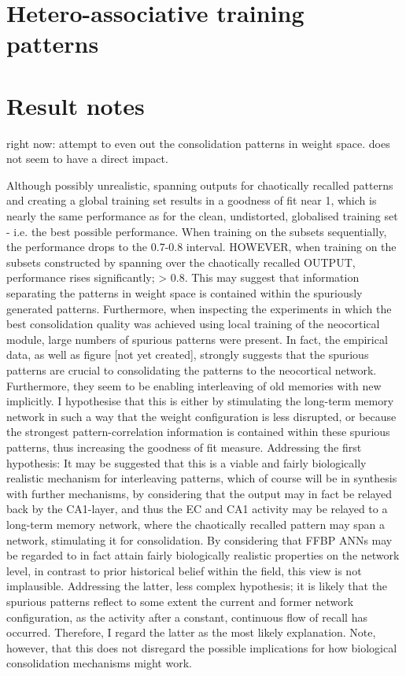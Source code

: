 \section{Hetero-associative training patterns}






\section*{Result notes}

right now: attempt to even out the consolidation patterns in weight space. does not seem to have a direct impact.

Although possibly unrealistic, spanning outputs for chaotically recalled patterns and creating a global training set results in a goodness of fit near 1, which is nearly the same performance as for the clean, undistorted, globalised training set - i.e. the best possible performance.
When training on the subsets sequentially, the performance drops to the 0.7-0.8 interval. HOWEVER, when training on the subsets constructed by spanning over the chaotically recalled OUTPUT, performance rises significantly; > 0.8.
This may suggest that information separating the patterns in weight space is contained within the spuriously generated patterns. Furthermore, when inspecting the experiments in which the best consolidation quality was achieved using local training of the neocortical module, large numbers of spurious patterns were present. In fact, the empirical data, as well as figure [not yet created], strongly suggests that the spurious patterns are crucial to consolidating the patterns to the neocortical network. Furthermore, they seem to be enabling interleaving of old memories with new implicitly. I hypothesise that this is either by stimulating the long-term memory network in such a way that the weight configuration is less disrupted, or because the strongest pattern-correlation information is contained within these spurious patterns, thus increasing the goodness of fit measure. Addressing the first hypothesis: It may be suggested that this is a viable and fairly biologically realistic mechanism for interleaving patterns, which of course will be in synthesis with further mechanisms, by considering that the output may in fact be relayed back by the CA1-layer, and thus the EC and CA1 activity may be relayed to a long-term memory network, where the chaotically recalled pattern may span a network, stimulating it for consolidation. By considering that FFBP ANNs may be regarded to in fact attain fairly biologically realistic properties on the network level, in contrast to prior historical belief within the field, this view is not implausible.
Addressing the latter, less complex hypothesis; it is likely that the spurious patterns reflect to some extent the current and former network configuration, as the activity after a constant, continuous flow of recall has occurred. Therefore, I regard the latter as the most likely explanation. Note, however, that this does not disregard the possible implications for how biological consolidation mechanisms might work.


